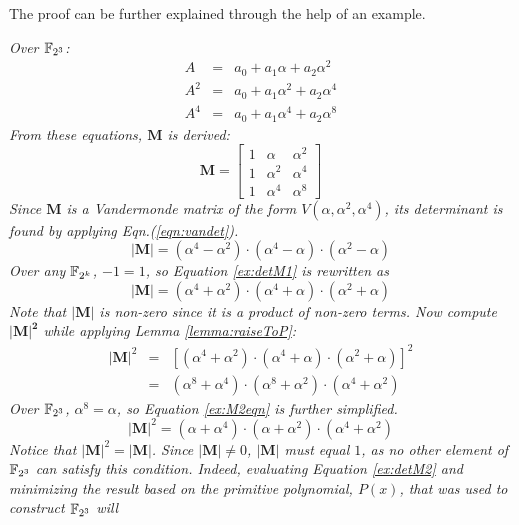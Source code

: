The proof can be further explained through the help of an example.
\begin{Example}
{\it Over ${\mathbb{F}}_{2^3}$:
\begin{eqnarray}
A&=&a_0+a_1\alpha+a_2\alpha^2 \nonumber \\
A^2&=&a_0+a_1\alpha^2+a_2\alpha^4 \nonumber \\
A^4&=&a_0+a_1\alpha^4+a_2\alpha^8
\end{eqnarray}
From these equations, $\mathbf{M}$ is derived:
\begin{equation}
\mathbf{M}=
\begin{bmatrix}
1 & \alpha   & \alpha^2 \\
1 & \alpha^2 & \alpha^4 \\
1 & \alpha^4 & \alpha^8
\end{bmatrix}
\end{equation}
Since $\mathbf{M}$ is a Vandermonde matrix of the form $V(\alpha,\alpha^2,\alpha^4)$, 
its determinant is found by applying Eqn.(\ref{eqn:vandet}).
\begin{equation}
\mathbf{|M|}=(\alpha^4-\alpha^2)\cdot(\alpha^4-\alpha)\cdot(\alpha^2-\alpha) \label{ex:detM1}
\end{equation}
Over any ${\mathbb{F}}_{2^k}$, $-1=1$, so Equation \ref{ex:detM1} is rewritten as
\begin{equation}
\mathbf{|M|}=(\alpha^4+\alpha^2)\cdot(\alpha^4+\alpha)\cdot(\alpha^2+\alpha) \label{ex:detM2}
\end{equation}
Note that $\mathbf{|M|}$ is non-zero since it is a product of non-zero terms.
Now compute $\mathbf{|M|^2}$ while applying Lemma \ref{lemma:raiseToP}:
\begin{eqnarray}
|\mathbf{M}|^2&=&[(\alpha^4+\alpha^2)\cdot(\alpha^4+\alpha)\cdot(\alpha^2+\alpha)]^2\\ \nonumber
&=&(\alpha^8+\alpha^4)\cdot(\alpha^8+\alpha^2)\cdot(\alpha^4+\alpha^2) \label{ex:M2eqn}
\end{eqnarray}
Over ${\mathbb{F}}_{2^3}$, $\alpha^8=\alpha$, so Equation \ref{ex:M2eqn} is further simplified.
\begin{equation}
|\mathbf{M}|^2=(\alpha+\alpha^4)\cdot(\alpha+\alpha^2)\cdot(\alpha^4+\alpha^2)
\end{equation}
Notice that $|\mathbf{M}|^2=|\mathbf{M}|$. Since $|\mathbf{M}|\neq 0$, $|\mathbf{M}|$ 
must equal $1$, as no other element of ${\mathbb{F}}_{2^3}$ can satisfy this condition.
Indeed, evaluating Equation \ref{ex:detM2} and minimizing the result based on 
the primitive polynomial, $P(x)$, that was used to construct ${\mathbb{F}}_{2^3}$ will 
}
\end{Example}
